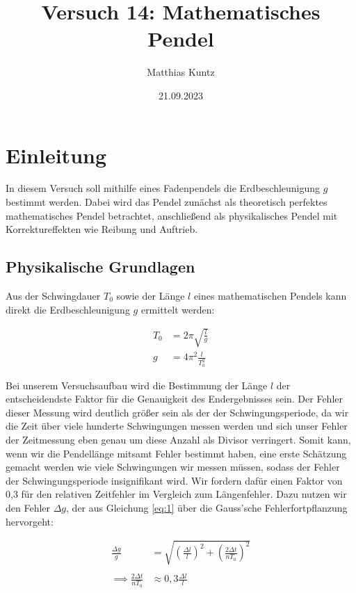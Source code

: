 \documentclass{article}
\title{Versuch 14: Mathematisches Pendel}
\author{Matthias Kuntz}
\date{21.09.2023}
\begin{document}
\maketitle

\section{Einleitung}

In diesem Versuch soll mithilfe eines Fadenpendels die Erdbeschleunigung $g$ bestimmt werden. Dabei wird das Pendel zunächst als theoretisch perfektes mathematisches Pendel betrachtet, anschließend als physikalisches Pendel mit Korrektureffekten wie Reibung und Auftrieb.  

\subsection{Physikalische Grundlagen}

Aus der Schwingdauer $T_0$ sowie der Länge $l$ eines mathematischen Pendels kann direkt die Erdbeschleunigung $g$ ermittelt werden:

\begin{equation}
    \begin{split}
        T_0 &= 2\pi \sqrt{\frac{l}{g}} \\
        g &= 4\pi^2 \frac{l}{T_0^2}
    \end{split}
    \label{eq:1}
\end{equation}

Bei unserem Versuchsaufbau wird die Bestimmung der Länge $l$ der entscheidendste Faktor für die Genauigkeit des Endergebnisses sein. Der Fehler dieser Messung wird deutlich größer sein als der der Schwingungsperiode, da wir die Zeit über viele hunderte Schwingungen messen werden und sich unser Fehler der Zeitmessung eben genau um diese Anzahl als Divisor verringert. Somit kann, wenn wir die Pendellänge mitsamt Fehler bestimmt haben, eine erste Schätzung gemacht werden wie viele Schwingungen wir messen müssen, sodass der Fehler der Schwingungsperiode insignifikant wird. Wir fordern dafür einen Faktor von 0,3 für den relativen Zeitfehler im Vergleich zum Längenfehler. Dazu nutzen wir den Fehler $\Delta g$, der aus Gleichung \ref{eq:1} über die Gauss'sche Fehlerfortpflanzung hervorgeht:

\begin{equation}
    \begin{split}
        \frac{\Delta g}{g} &= \sqrt{\left( \frac{\Delta l}{l} \right)^2 + \left( \frac{2 \Delta t}{n T_0} \right)^2} \\ \\
        \implies \frac{2 \Delta t}{n T_0} &\approx 0,3 \frac{\Delta l}{l}
    \end{split}
    \label{eq:2}
\end{equation}
\end{document}

